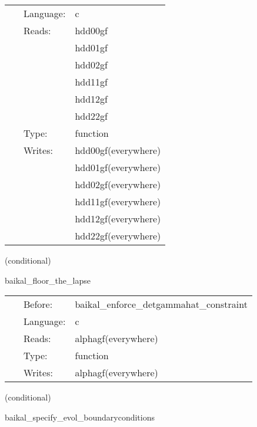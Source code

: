  \begin{tabular*}{160mm}{cll} 
~ & Language:  & c \\ 
~ & Reads:  & hdd00gf \\ 
~& ~ &hdd01gf\\ 
~& ~ &hdd02gf\\ 
~& ~ &hdd11gf\\ 
~& ~ &hdd12gf\\ 
~& ~ &hdd22gf\\ 
~ & Type:  & function \\ 
~ & Writes:  & hdd00gf(everywhere) \\ 
~& ~ &hdd01gf(everywhere)\\ 
~& ~ &hdd02gf(everywhere)\\ 
~& ~ &hdd11gf(everywhere)\\ 
~& ~ &hdd12gf(everywhere)\\ 
~& ~ &hdd22gf(everywhere)\\ 
\end{tabular*} 


\vspace{5mm}

   (conditional) 

\hspace{5mm} baikal\_floor\_the\_lapse 

\hspace{5mm}{\it set lapse = max(lapse\_floor, lapse) } 


\hspace{5mm}

 \begin{tabular*}{160mm}{cll} 
~ & Before:  & baikal\_enforce\_detgammahat\_constraint \\ 
~ & Language:  & c \\ 
~ & Reads:  & alphagf(everywhere) \\ 
~ & Type:  & function \\ 
~ & Writes:  & alphagf(everywhere) \\ 
\end{tabular*} 


\vspace{5mm}

   (conditional) 

\hspace{5mm} baikal\_specify\_evol\_boundaryconditions 

\hspace{5mm}{\it register boundary conditions and perform amr+interprocessor synchronization } 


